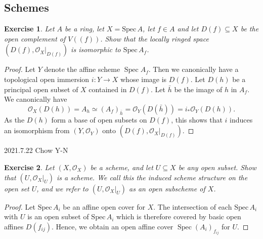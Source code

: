 \documentclass{amsart}
\newtheorem{exe}{Exercise}[subsection]
\begin{document}
\subsection{Schemes}
\begin{exe}
	Let $A$ be a ring, let $X= \mathrm{Spec}\, A$, let $f \in A$ and let $D(f) \subseteq X$ be the open complement of $V((f))$. Show that the locally ringed space $\left(D(f),\mathcal{O}_{X}|_{D(f)}\right)$ is isomorphic to $\mathrm{Spec}\, A_{f}$.
\end{exe}
\begin{proof}
	Let $Y$ denote the affine scheme $\operatorname{Spec} A_{f} .$ Then we canonically have a topological open immersion $i: Y \rightarrow X$ whose image is $D(f) .$ Let $D(h)$ be a principal open subset of $X$ contained in $D(f)$. Let $\bar{h}$ be the image of $h$ in $A_{f} .$ We canonically have $$\mathcal{O}_{X}(D(h))=A_{h} \simeq\left(A_{f}\right)_{\bar{h}}=\mathcal{O}_{Y}(D(\bar{h}))=i_{*} \mathcal{O}_{Y}(D(h)) .$$ As the $D(h)$ form a base of open subsets on $D(f)$, this shows that $i$ induces an isomorphism from $\left(Y, \mathcal{O}_{Y}\right)$ onto $\left(D(f),\mathcal{O}_{X}|_{D(f)}\right)$.
\end{proof}

2021.7.22 Chow Y-N
\begin{exe}
	Let $\left(X, \mathcal{O}_{X}\right)$ be a scheme, and let $U \subseteq X$ be any open subset. Show that $\left(U,\left.\mathcal{O}_{X}\right|_{U}\right)$ is a scheme. We call this the \emph{induced scheme structure} on the open set $U$, and we refer to $(U,\mathcal{O}_X|_U)$ as an \emph{open subscheme} of $X$.
\end{exe}

\begin{proof}
	Let $\mathrm{Spec}\, A_{i}$ be an affine open cover for $X$. The intersection of each $\mathrm{Spec}\, A_{i}$ with $U$ is an open subset of $\mathrm{Spec}\, A_{i}$ which is therefore covered by basic open affines $D(f_{i j})$. Hence, we obtain an open affine cover $\operatorname{Spec}\left(A_{i}\right)_{f_{ij}}$ for $U$.
\end{proof}
\end{document}
